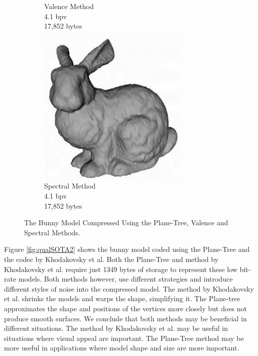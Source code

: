 \begin{figure}[H]
\begin{center}
\begin{subfigure}[b]{3in}
                \captionsetup{justification=centering}
                \caption{Valence Method \cite{touma98triangle}\\4.1 bpv\\17,852 bytes}
                \label{fig:PT_SOTAQ1_TG}
        \end{subfigure}%
        \begin{subfigure}[b]{3in}
                \includegraphics[width=2.8in]{images/experiments/pt_qual/kg}
                \captionsetup{justification=centering}
                \caption{Spectral Method \cite{Karni00Spectral}\\4.1 bpv\\17,852 bytes}
                \label{fig:PT_SOTAQ1_KG}
        \end{subfigure}
       \caption{The Bunny Model Compressed Using the Plane-Tree, Valence and Spectral Methods.}
       \label{fig:qualSOTA1}
       \end{center}
\end{figure}

Figure \ref{fig:qualSOTA2} shows the bunny model coded using the Plane-Tree and the codec by Khodakovsky et al. Both the Plane-Tree and method by Khodakovsky et al. require just 1349 bytes of storage to represent these low bit-rate models. Both methods however, use different strategies and introduce different styles of noise into the compressed model. The method by Khodakovsky et al. shrinks the models and warps the shape, simplifying it. The Plane-tree approximates the shape and positions of the vertices more closely but does not produce smooth surfaces. We conclude that both methods may be beneficial in different situations. The method by Khodakovsky et al. may be useful in situations where visual appeal are important. The Plane-Tree method may be more useful in applications where model shape and size are more important. \\

